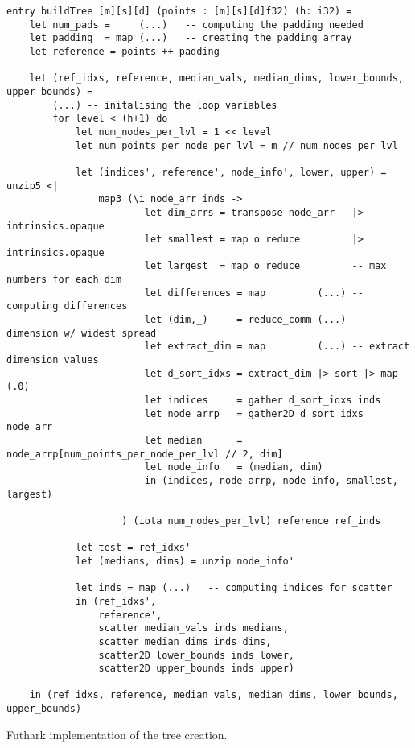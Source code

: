 \begin{listing}[H]
\begin{verbatim}
entry buildTree [m][s][d] (points : [m][s][d]f32) (h: i32) =
    let num_pads =     (...)   -- computing the padding needed
    let padding  = map (...)   -- creating the padding array
    let reference = points ++ padding

    let (ref_idxs, reference, median_vals, median_dims, lower_bounds, upper_bounds) =
    	(...) -- initalising the loop variables
        for level < (h+1) do
            let num_nodes_per_lvl = 1 << level
            let num_points_per_node_per_lvl = m // num_nodes_per_lvl

            let (indices', reference', node_info', lower, upper) = unzip5 <|
                map3 (\i node_arr inds ->
                        let dim_arrs = transpose node_arr   |> intrinsics.opaque
                        let smallest = map o reduce         |> intrinsics.opaque
                        let largest  = map o reduce         -- max numbers for each dim
                        let differences = map         (...) -- computing differences
                        let (dim,_)     = reduce_comm (...) -- dimension w/ widest spread
                        let extract_dim = map         (...) -- extract dimension values
                        let d_sort_idxs = extract_dim |> sort |> map (.0)
                        let indices     = gather d_sort_idxs inds
                        let node_arrp   = gather2D d_sort_idxs node_arr
                        let median      = node_arrp[num_points_per_node_per_lvl // 2, dim]
                        let node_info   = (median, dim)
                        in (indices, node_arrp, node_info, smallest, largest)

                    ) (iota num_nodes_per_lvl) reference ref_inds

            let test = ref_idxs'
            let (medians, dims) = unzip node_info'

            let inds = map (...)   -- computing indices for scatter
            in (ref_idxs', 
                reference', 
                scatter median_vals inds medians,
                scatter median_dims inds dims, 
                scatter2D lower_bounds inds lower,
                scatter2D upper_bounds inds upper)

    in (ref_idxs, reference, median_vals, median_dims, lower_bounds, upper_bounds)
\end{verbatim}
\caption{Futhark implementation of the tree creation.}
\label{lst:tree}
\end{listing}



